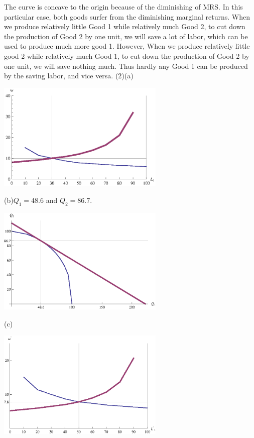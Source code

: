 \documentclass{article}
\begin{document}
\begin{description}
\begin{center}
            \end{center}
            The curve is concave to the origin because of the diminishing of MRS. In this particular case, both goods surfer from the diminishing marginal returns. When we produce relatively little Good 1 while relatively much Good 2, to cut down the production of Good 2 by one unit, we will save a lot of labor, which can be used to produce much more good 1. However, When we produce relatively little good 2 while relatively much Good 1, to cut down the production of Good 2 by one unit, we will save nothing much. Thus hardly any Good 1 can be produced by the saving labor, and vice versa.\newpage
        (2)(a)\begin{center}
                    \includegraphics[angle=0, width=0.6\textwidth]{ECON3610A19}
            \end{center}
           (b)$Q_1=48.6$ and $Q_2=86.7$.\\
           \begin{center}
                    \includegraphics[angle=0, width=0.6\textwidth]{ECON3610A112}
            \end{center}
           (c)\begin{center}
                    \includegraphics[angle=0, width=0.6\textwidth]{ECON3610A113}

\end{center}
\end{description}
\end{document}
